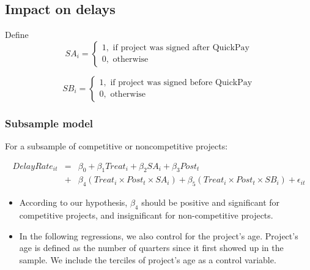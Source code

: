 \documentclass[
]{article}
\providecommand{\tightlist}{%
  \setlength{\itemsep}{0pt}\setlength{\parskip}{0pt}}
\begin{document}
\hypertarget{impact-on-delays}{%
\subsection{Impact on delays}\label{impact-on-delays}}

Define
\[ SA_i = \begin{cases} 1, \text{ if project was signed after QuickPay}\\
0, \text{ otherwise} \end{cases}\]

\[ SB_i = \begin{cases} 1, \text{ if project was signed before QuickPay}\\
0, \text{ otherwise} \end{cases}\]

\hypertarget{subsample-model}{%
\subsubsection{Subsample model}\label{subsample-model}}

For a subsample of competitive or noncompetitive projects:

\[ \begin{aligned} DelayRate_{it} &=& \beta_0 +\beta_1 Treat_i+ \beta_2 SA_i+ \beta_3 Post_t \\&+& \beta_4 (Treat_i \times Post_t \times SA_i )+\beta_5 (Treat_i \times Post_t \times SB_i )+\epsilon_{it} \end{aligned} \]

\begin{itemize}
\tightlist
\item
  According to our hypothesis, \(\beta_4\) should be positive and
  significant for competitive projects, and insignificant for
  non-competitive projects.
\item
  In the following regressions, we also control for the project's age.
  Project's age is defined as the number of quarters since it first
  showed up in the sample. We include the terciles of project's age as a
  control variable.
\end{itemize}
\end{document}
